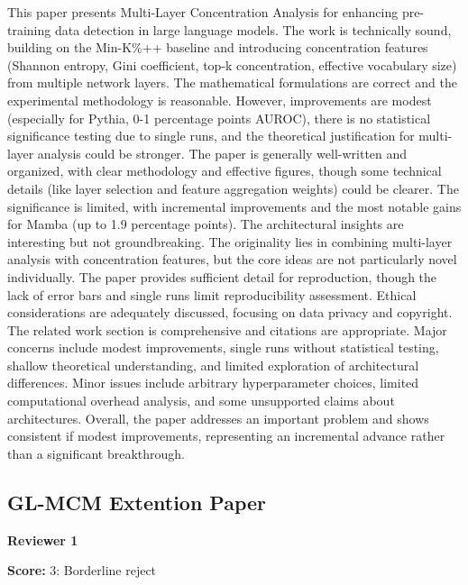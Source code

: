 \begin{tcolorbox}[
    colback=white,
    colframe=black!70,
    title=Reviewer Comments,
    breakable=true,
    fonttitle=\bfseries
]
This paper presents Multi-Layer Concentration Analysis for enhancing pre-training data detection in large language models. The work is technically sound, building on the Min-K\%++ baseline and introducing concentration features (Shannon entropy, Gini coefficient, top-k concentration, effective vocabulary size) from multiple network layers. The mathematical formulations are correct and the experimental methodology is reasonable. However, improvements are modest (especially for Pythia, 0-1 percentage points AUROC), there is no statistical significance testing due to single runs, and the theoretical justification for multi-layer analysis could be stronger. The paper is generally well-written and organized, with clear methodology and effective figures, though some technical details (like layer selection and feature aggregation weights) could be clearer. The significance is limited, with incremental improvements and the most notable gains for Mamba (up to 1.9 percentage points). The architectural insights are interesting but not groundbreaking. The originality lies in combining multi-layer analysis with concentration features, but the core ideas are not particularly novel individually. The paper provides sufficient detail for reproduction, though the lack of error bars and single runs limit reproducibility assessment. Ethical considerations are adequately discussed, focusing on data privacy and copyright. The related work section is comprehensive and citations are appropriate. Major concerns include modest improvements, single runs without statistical testing, shallow theoretical understanding, and limited exploration of architectural differences. Minor issues include arbitrary hyperparameter choices, limited computational overhead analysis, and some unsupported claims about architectures. Overall, the paper addresses an important problem and shows consistent if modest improvements, representing an incremental advance rather than a significant breakthrough.

\end{tcolorbox}


\subsection{GL-MCM Extention Paper}
\textbf{Reviewer 1}
\begin{tcolorbox}[
    colback=gray!5,
    colframe=gray!60,
    title=Review Score,
    fonttitle=\bfseries
]
\textbf{Score:} 3: Borderline reject
\end{tcolorbox}

